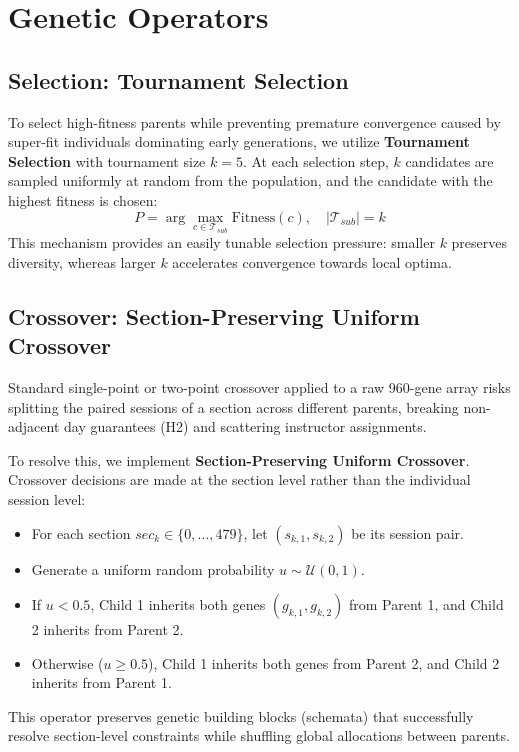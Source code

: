 
\chapter{Genetic Operators}

\section{Selection: Tournament Selection}
To select high-fitness parents while preventing premature convergence caused by super-fit individuals dominating early generations, we utilize \textbf{Tournament Selection} with tournament size $k = 5$.
At each selection step, $k$ candidates are sampled uniformly at random from the population, and the candidate with the highest fitness is chosen:
\begin{equation}
  P = \arg\max_{c \in \mathcal{T}_{sub}} \text{Fitness}(c), \quad |\mathcal{T}_{sub}| = k
\end{equation}
This mechanism provides an easily tunable selection pressure: smaller $k$ preserves diversity, whereas larger $k$ accelerates convergence towards local optima.

\section{Crossover: Section-Preserving Uniform Crossover}
Standard single-point or two-point crossover applied to a raw 960-gene array risks splitting the paired sessions of a section across different parents, breaking non-adjacent day guarantees (H2) and scattering instructor assignments.

To resolve this, we implement \textbf{Section-Preserving Uniform Crossover}. Crossover decisions are made at the section level rather than the individual session level:
\begin{itemize}[leftmargin=1.5em]
  \item For each section $sec_k \in \{0, \dots, 479\}$, let $(s_{k, 1}, s_{k, 2})$ be its session pair.
  \item Generate a uniform random probability $u \sim \mathcal{U}(0, 1)$.
  \item If $u < 0.5$, Child 1 inherits both genes $(g_{k, 1}, g_{k, 2})$ from Parent 1, and Child 2 inherits from Parent 2.
  \item Otherwise ($u \ge 0.5$), Child 1 inherits both genes from Parent 2, and Child 2 inherits from Parent 1.
\end{itemize}
This operator preserves genetic building blocks (schemata) that successfully resolve section-level constraints while shuffling global allocations between parents.

